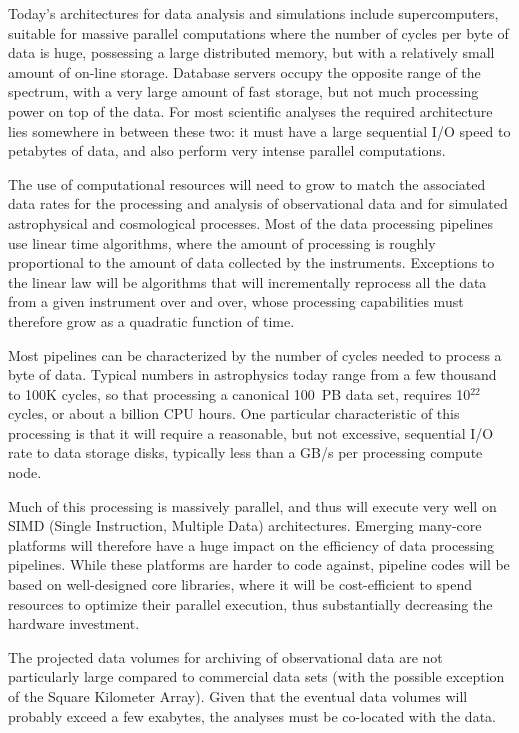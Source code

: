 Today's architectures for data analysis and simulations include
supercomputers, suitable for massive parallel computations where the
number of cycles per byte of data is huge, possessing a large
distributed memory, but with a relatively small amount of on-line
storage. Database servers occupy the opposite range of the spectrum,
with a very large amount of fast storage, but not much processing
power on top of the data. For most scientific analyses the required
architecture lies somewhere in between these two: it must have a large
sequential I/O speed to petabytes of data, and also perform very
intense parallel computations. 

The use of computational resources will need to grow to match the
associated data rates for the processing and analysis of observational
data and for simulated astrophysical and cosmological processes. Most
of the data processing pipelines use linear time algorithms, where the
amount of processing is roughly proportional to the amount of data
collected by the instruments. Exceptions to the linear law will be
algorithms that will incrementally reprocess all the data from a given
instrument over and over, whose processing capabilities must therefore
grow as a quadratic function of time.

Most pipelines can be characterized by the number of cycles needed to
process a byte of data. Typical numbers in astrophysics today range
from a few thousand to 100K cycles, so that processing a canonical
100~PB data set, requires 10$^{22}$ cycles, or about a billion CPU
hours. One particular characteristic of this processing is that it
will require a reasonable, but not excessive, sequential I/O rate to
data storage disks, typically less than a GB/s per processing compute
node.

Much of this processing is massively parallel, and thus will execute
very well on SIMD (Single Instruction, Multiple Data)
architectures. Emerging many-core platforms will therefore have a huge
impact on the efficiency of data processing pipelines. While these
platforms are harder to code against, pipeline codes will be based on
well-designed core libraries, where it will be cost-efficient to spend
resources to optimize their parallel execution, thus substantially
decreasing the hardware investment.

The projected data volumes for archiving of observational data are not
particularly large compared to commercial data sets (with the possible
exception of the Square Kilometer Array). Given that the eventual data
volumes will probably exceed a few exabytes, the analyses must be
co-located with the data.

